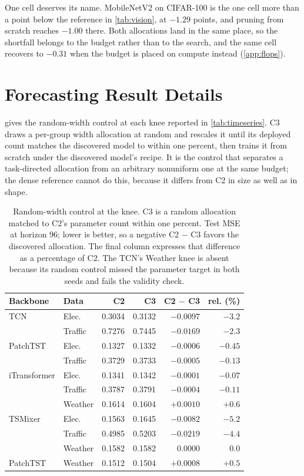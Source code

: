\documentclass[10pt]{article}
\theoremstyle{paper}
\begin{document}
One cell deserves its name. MobileNetV2 on CIFAR-100 is the one cell more than a point below the reference in \cref{tab:vision}, at
$-1.29$ points, and pruning from scratch reaches $-1.00$ there. Both allocations land in the same
place, so the shortfall belongs to the budget rather than to the search, and the same cell
recovers to $-0.31$ when the budget is placed on compute instead (\cref{app:flops}).

\section{Forecasting Result Details}
\label{app:ts-results}
 gives the random-width control at each knee reported in \cref{tab:timeseries}. C3 draws a per-group width allocation at random and rescales it until its deployed count matches the discovered model to within one percent, then trains it from scratch under the discovered model's recipe. It is the control that separates a task-directed allocation from an arbitrary nonuniform one at the same budget; the dense reference cannot do this, because it differs from C2 in size as well as in shape.

\begin{table}[h]
\centering
\caption{Random-width control at the knee. C3 is a random allocation matched to C2's parameter count within one percent. Test MSE at horizon 96; lower is better, so a negative C2 $-$ C3 favors the discovered allocation. The final column expresses that difference as a percentage of C2. The TCN's Weather knee is absent because its random control missed the parameter target in both seeds and fails the validity check.}
\label{tab:ts-control}
\footnotesize
\setlength{\tabcolsep}{4.0pt}
\begin{tabular}{@{}llrrrr@{}}
\toprule
Backbone & Data & C2 & C3 & C2 $-$ C3 & rel. (\%) \\
\midrule
TCN        & Elec.  & 0.3034 & 0.3132 & $-0.0097$ & $-3.2$ \\
           & Traffic& 0.7276 & 0.7445 & $-0.0169$ & $-2.3$ \\
PatchTST   & Elec.  & 0.1327 & 0.1332 & $-0.0006$ & $-0.45$ \\
           & Traffic& 0.3729 & 0.3733 & $-0.0005$ & $-0.13$ \\
iTransformer& Elec. & 0.1341 & 0.1342 & $-0.0001$ & $-0.07$ \\
           & Traffic& 0.3787 & 0.3791 & $-0.0004$ & $-0.11$ \\
           & Weather& 0.1614 & 0.1604 & $+0.0010$ & $+0.6$ \\
TSMixer    & Elec.  & 0.1563 & 0.1645 & $-0.0082$ & $-5.2$ \\
           & Traffic& 0.4985 & 0.5203 & $-0.0219$ & $-4.4$ \\
           & Weather& 0.1582 & 0.1582 & $0.0000$ & $0.0$ \\
PatchTST   & Weather& 0.1512 & 0.1504 & $+0.0008$ & $+0.5$ \\
\bottomrule
\end{tabular}
\end{table}
\end{document}
